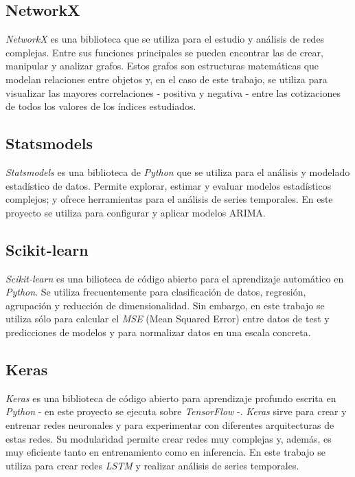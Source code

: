 \subsection{NetworkX}\label{networkx}

\emph{NetworkX} \citep{online:networkx} es una biblioteca que se utiliza para el estudio y análisis de redes complejas. Entre sus funciones principales se pueden encontrar las de crear, manipular y analizar grafos. Estos grafos son estructuras matemáticas que modelan relaciones entre objetos y, en el caso de  este trabajo, se utiliza para visualizar las mayores correlaciones - positiva y negativa - entre las cotizaciones de todos los valores de los índices estudiados. 

\subsection{Statsmodels}\label{statsmodels}

\emph{Statsmodels} \citep{online:statsmodels} es una biblioteca de \emph{Python} que se utiliza para el análisis y modelado estadístico de datos. Permite explorar, estimar y evaluar modelos estadísticos complejos; y ofrece herramientas para el análisis de series temporales. En este proyecto se utiliza para configurar y aplicar modelos ARIMA. 

\subsection{Scikit-learn}\label{scikit-learn}

\emph{Scikit-learn} \citep{online:scikit_learn} es una bilioteca de código abierto para el aprendizaje automático en \emph{Python}. Se utiliza frecuentemente para clasificación de datos, regresión, agrupación y reducción de dimensionalidad. Sin embargo, en este trabajo se utiliza sólo para calcular el \emph{MSE} (Mean Squared Error) entre datos de test y predicciones de modelos y para normalizar datos en una escala concreta.  

\subsection{Keras}\label{keras}

\emph{Keras} \citep{online:keras} es una biblioteca de código abierto para aprendizaje profundo escrita en \emph{Python} - en este proyecto se ejecuta sobre \emph{TensorFlow} \citep{online:tensorflow} -. \emph{Keras} sirve para crear y entrenar redes neuronales y para experimentar con diferentes arquitecturas de estas redes. Su modularidad permite crear redes muy complejas y, además, es muy eficiente tanto en entrenamiento como en inferencia. En este trabajo se utiliza para crear redes \emph{LSTM} y realizar análisis de series temporales. 


